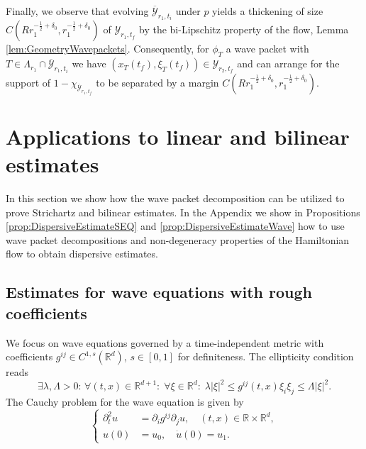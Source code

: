 \documentclass{amsart}
\theoremstyle{definition}
\newcommand{\R}{\mathbb{R}}
\begin{document}
Finally, we observe that evolving $\overline{\mathcal{Y}}_{r_1,t_i}$ under $p$ yields a thickening of size \\
$C(R r_1^{-\frac{1}{2}+\delta_0},r_1^{-\frac{1}{2}+\delta_0})$ of $\mathcal{Y}_{r_1,t_f}$ by the bi-Lipschitz property of the flow, Lemma \ref{lem:GeometryWavepackets}.
Consequently, for $\phi_T$ a wave packet with $T \in \Lambda_{r_1} \cap \overline{\mathcal{Y}}_{r_1,t_i}$ we have $(x_T(t_f),\xi_T(t_f)) \in \mathcal{Y}_{r_2,t_f}$ and can arrange for the support of $1- \chi_{\overline{\mathcal{Y}}_{r_1,t_f}}$ to be separated by a margin $C(R r_1^{-\frac{1}{2}+\delta_0},r_1^{-\frac{1}{2}+\delta_0})$.

\section{Applications to linear and bilinear estimates}
\label{section:Applications}
In this section we show how the wave packet decomposition can be utilized to prove Strichartz and bilinear estimates. In the Appendix we show in Propositions \ref{prop:DispersiveEstimateSEQ} and \ref{prop:DispersiveEstimateWave} how to use wave packet decompositions and non-degeneracy properties of the Hamiltonian flow to obtain dispersive estimates.

\subsection{Estimates for wave equations with rough coefficients}
We focus on wave equations governed by a time-independent metric with coefficients $g^{ij} \in C^{1,s}(\R^{d})$, $s \in [0,1]$ for definiteness. The ellipticity condition reads
\begin{equation}
\label{eq:EllipticityLinearBilinear}
\exists \lambda, \Lambda > 0: \, \forall (t,x) \in \R^{d+1}: \; \forall \xi \in \R^d: \; \lambda |\xi|^2 \leq g^{ij}(t,x) \xi_i \xi_j \leq \Lambda |\xi|^2.
\end{equation}
The Cauchy problem for the wave equation is given by
\begin{equation}
\label{eq:CauchyProblemRoughWaveEquation}
\left\{ \begin{array}{cl}
\partial_t^2 u &= \partial_i g^{ij} \partial_j u, \quad (t,x) \in \R \times \R^d, \\
u(0) &= u_0, \quad \dot{u}(0) = u_1.
\end{array} \right.
\end{equation}
\end{document}

